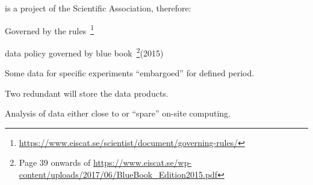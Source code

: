 \begin{frame}[fragile,t]
\vspace{\mytopbit}
\bitm
\item{\ED is a project of the \EC Scientific Association, therefore:}
  \item{Governed by the \EC rules~\footnote{\url{https://www.eiscat.se/scientist/document/governing-rules/}}}
  \item{\EC data policy governed by blue book~\footnote{{Page 39 onwards of} \tiny \url{https://www.eiscat.se/wp-content/uploads/2017/06/BlueBook_Edition2015.pdf}}(2015)}
  \item{Some data for specific experiments ``embargoed'' for defined period.}
  \item{Two redundant  will store the data products.}
  \item{Analysis of data either close to  or ``spare'' on-site computing.}
\eitm
\end{frame}
